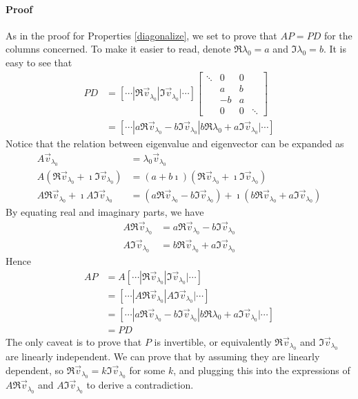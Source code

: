 \begin{thm}
\paragraph{Proof}
As in the proof for Properties \ref{diagonalize}, we set to prove that $AP = PD$ for the columns concerned. To make it easier to read, denote $\Re{\lambda_0} = a$ and $\Im{\lambda_0} = b$. It is easy to see that
\begin{align*}
PD &=
[\cdots|\Re{\vec{v}_{\lambda_0}}|\Im{\vec{v}_{\lambda_0}}|\cdots]
\begin{bmatrix}
\ddots & 0 & 0 & \\
& a & b & \\
& -b & a & \\
& 0 & 0 & \ddots
\end{bmatrix} \\
&= [\cdots|a\Re{\vec{v}_{\lambda_0}} - b\Im{\vec{v}_{\lambda_0}} | b\Re{\lambda_0} + a\Im{\vec{v}_{\lambda_0}}|\cdots]
\end{align*}
Notice that the relation between eigenvalue and eigenvector can be expanded as
\begin{align*}
A\vec{v}_{\lambda_0} &= \lambda_0\vec{v}_{\lambda_0} \\
A(\Re{\vec{v}_{\lambda_0}} + \imath \Im{\vec{v}_{\lambda_0}}) &= (a+b\imath)(\Re{\vec{v}_{\lambda_0}} + \imath \Im{\vec{v}_{\lambda_0}}) \\
A\Re{\vec{v}_{\lambda_0}} + \imath A\Im{\vec{v}_{\lambda_0}} &= (a\Re{\vec{v}_{\lambda_0}} - b\Im{\vec{v}_{\lambda_0}}) + \imath(b\Re{\vec{v}_{\lambda_0}} + a\Im{\vec{v}_{\lambda_0}})
\end{align*}
By equating real and imaginary parts, we have
\begin{align*}
A\Re{\vec{v}_{\lambda_0}} &= a\Re{\vec{v}_{\lambda_0}} - b\Im{\vec{v}_{\lambda_0}} \\
A\Im{\vec{v}_{\lambda_0}} &= b\Re{\vec{v}_{\lambda_0}} + a\Im{\vec{v}_{\lambda_0}}
\end{align*}
Hence
\begin{align*}
AP &= A[\cdots|\Re{\vec{v}_{\lambda_0}}|\Im{\vec{v}_{\lambda_0}}|\cdots] \\
&= [\cdots|A\Re{\vec{v}_{\lambda_0}}|A\Im{\vec{v}_{\lambda_0}}|\cdots] \\
&= [\cdots|a\Re{\vec{v}_{\lambda_0}} - b\Im{\vec{v}_{\lambda_0}} | b\Re{\lambda_0} + a\Im{\vec{v}_{\lambda_0}}|\cdots] \\
&= PD
\end{align*}
The only caveat is to prove that $P$ is invertible, or equivalently $\Re{\vec{v}_{\lambda_0}}$ and $\Im{\vec{v}_{\lambda_0}}$ are linearly independent. We can prove that by assuming they are linearly dependent, so $\Re{\vec{v}_{\lambda_0}} = k\Im{\vec{v}_{\lambda_0}}$ for some $k$, and plugging this into the expressions of $A\Re{\vec{v}_{\lambda_0}}$ and $A\Im{\vec{v}_{\lambda_0}}$ to derive a contradiction.
\end{thm}

